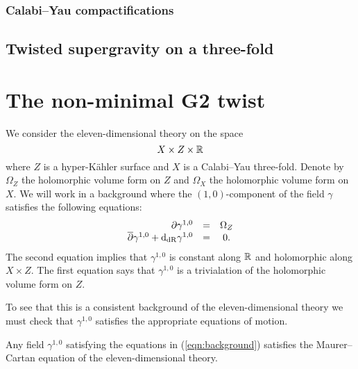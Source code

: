 \documentclass[11pt]{amsart}
\begin{document}
\subsubsection{Calabi--Yau compactifications}
\label{sec:org16a2c98}
\subsection{Twisted supergravity on a three-fold}
\label{sec:org774abb4}
\section{The non-minimal G2 twist}
\label{sec:org590ab85}


We consider the eleven-dimensional theory on the space
\[
  X \times Z \times \mathbb R
\]
where $Z$ is a hyper-K\"{a}hler surface and $X$ is a Calabi--Yau three-fold.
Denote by $\Omega_Z$ the holomorphic volume form on $Z$ and $\Omega_X$ the holomorphic volume form on $X$.
We will work in a background where the $(1,0)$-component of the field $\gamma$ satisfies the following equations:
\begin{equation}\label{eqn:background}
  \begin{array}{rcccc}
    \partial \gamma^{1,0} & = & \Omega_Z \\
    \overline{\partial} \gamma^{1,0} + {\rm d}_{\rm dR} \gamma^{1,0} & = & 0 .
  \end{array}
\end{equation}
The second equation implies that $\gamma^{1,0}$ is constant along $\mathbb R$ and holomorphic along $X \times Z$.
The first equation says that $\gamma^{1,0}$ is a trivialation of the holomorphic volume form on $Z$.

To see that this is a consistent background of the eleven-dimensional theory we must check that $\gamma^{1,0}$ satisfies the appropriate equations of motion.

\begin{lem}
  Any field $\gamma^{1,0}$ satisfying the equations in (\ref{eqn:background}) satisfies the Maurer--Cartan equation of the eleven-dimensional theory.
\end{lem}
\end{document}

